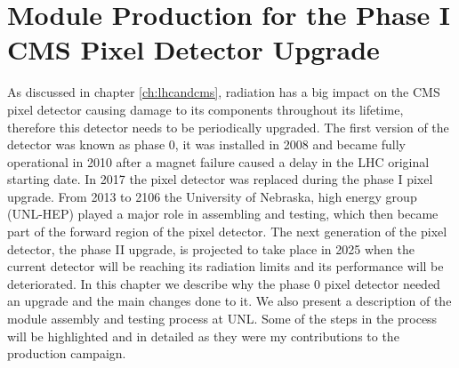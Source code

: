 \chapter{Module Production for the Phase I CMS Pixel Detector Upgrade}\label{ch:phase1}

As discussed in chapter \ref{ch:lhcandcms}, radiation has a big impact on the CMS pixel detector causing damage to its components throughout its lifetime, therefore this detector needs to be periodically upgraded. The first version of the detector was known as phase 0, it was installed in 2008 and became fully operational in 2010 after a magnet failure caused a delay in the LHC original starting date. In 2017 the pixel detector was replaced during the phase I pixel upgrade. From 2013 to 2106 the University of Nebraska, high energy group (UNL-HEP) played a major role in assembling and testing, which then became part of the forward region of the pixel detector. The next generation of the pixel detector, the phase II upgrade, is projected to take place in 2025 when the current detector will be reaching its radiation limits and its performance will be deteriorated. In this chapter we describe why the phase 0 pixel detector needed an upgrade and the main changes done to it. We also present a description of the module assembly and testing process at UNL. Some of the steps in the process will be highlighted and in detailed as they were my contributions to the production campaign.


